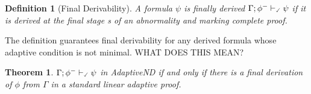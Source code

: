 \documentclass[]{article}
\newtheorem{definition}{Definition}
\newtheorem{theorem}{Theorem}
\newcommand{\TurnChecked}[2]
    { {#1}\vdash_{\textbf{\sf \checked}}  {#2}}
\begin{document}
\begin{definition}[Final Derivability]\label{def:finalder}
A formula $\psi$ is finally derived $\TurnChecked{\Gamma;\phi^{-}}{\psi}$ if it is derived at the final stage {\sf s} of an abnormality and marking complete proof.
\end{definition}
%
The definition guarantees final derivability for any derived formula {\color{red}whose adaptive condition is not minimal. WHAT DOES THIS MEAN?}



\begin{theorem}
$\TurnChecked{\Gamma;\phi^{-}}{\psi}$ in {\sf AdaptiveND} if and only if there is a final derivation of $\phi$ from $\Gamma$ in a standard linear adaptive proof.
\end{theorem}
\end{document}
